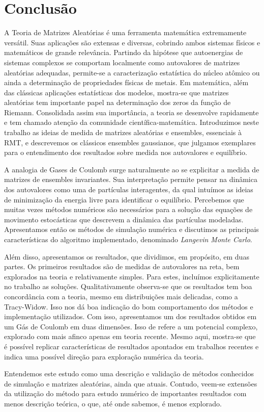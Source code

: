 \chapter{Conclusão}
\label{Capitulo: Conclusão}

A Teoria de Matrizes Aleatórias é uma ferramenta matemática extremamente versátil. Suas aplicações são extensas e diversas, cobrindo ambos sistemas físicos e matemáticos de grande relevância. Partindo da hipótese que autoenergias de sistemas complexos se comportam localmente como autovalores de matrizes aleatórias adequadas, permite-se a caracterização estatística do núcleo atômico ou ainda a determinação de propriedades físicas de metais. Em matemática, além das clássicas aplicações estatísticas dos modelos, mostra-se que matrizes aleatórias tem importante papel na determinação dos zeros da função de Riemann. Consolidada assim sua importância, a teoria se desenvolve rapidamente e tem chamado atenção da comunidade científica-matemática. Introduzimos neste trabalho as ideias de medida de matrizes aleatórias e ensembles, essenciais à RMT, e descrevemos os clássicos ensembles gaussianos, que julgamos exemplares para o entendimento dos resultados sobre medida nos autovalores e equilíbrio.
 
A analogia de Gases de Coulomb surge naturalmente ao se explicitar a medida de matrizes de ensembles invariantes. Sua interpretação permite pensar na dinâmica dos autovalores como uma de partículas interagentes, da qual intuímos as ideias de minimização da energia livre para identificar o equilíbrio. Percebemos que muitas vezes métodos numéricos são necessários para a solução das equações de movimento estocásticas que descrevem a dinâmica das partículas modeladas. Apresentamos então os métodos de simulação numérica e discutimos as principais características do algoritmo implementado, denominado \textit{Langevin Monte Carlo}.

Além disso, apresentamos os resultados, que dividimos, em propósito, em duas partes. Os primeiros resultados são de medidas de autovalores na reta, bem explorados na teoria e relativamente simples. Para estes, incluímos explicitamente no trabalho as soluções. Qualitativamente observa-se que os resultados tem boa concordância com a teoria, mesmo em distribuições mais delicadas, como a Tracy-Widow. Isso nos dá boa indicação do bom comportamento dos métodos e implementação utilizados. Com isso, apresentamos um dos resultados obtidos em um Gás de Coulomb em duas dimensões. Isso de refere a um potencial complexo, explorado com mais afinco apenas em teoria recente. Mesmo aqui, mostra-se que é possível replicar características de resultados apontados em trabalhos recentes e indica uma possível direção para exploração numérica da teoria.

Entendemos este estudo como uma descrição e validação de métodos conhecidos de simulação e matrizes aleatórias, ainda que atuais. Contudo, veem-se extensões da utilização do método para estudo numérico de importantes resultados com menos descrição teórica, o que, até onde sabemos, é menos explorado.
